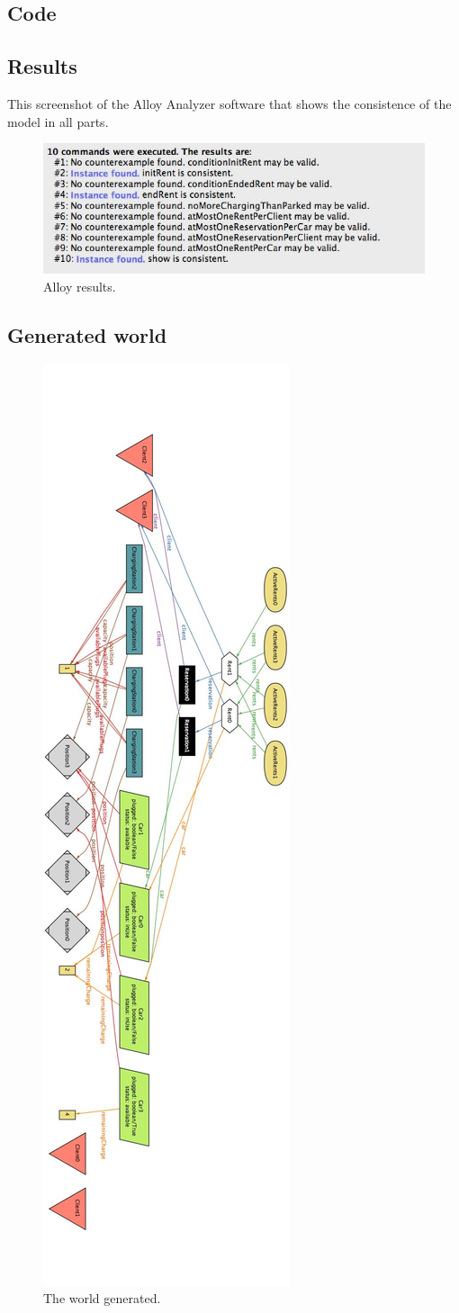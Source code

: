 \subsection{Code}


\subsection{Results}
This screenshot of the Alloy Analyzer software that shows the consistence of the model in all parts.

\begin{figure}[h]
\centering
\includegraphics[width=450 pt]{resources/alloyResults.jpg}
\caption{\label{fig:AlloyRes}Alloy results.}
\end{figure}

\newpage
\subsection{Generated world}

\begin{figure}[hp]
\centering
\includegraphics[height=526 pt]{resources/generatedWorld.jpg}
\caption{\label{fig:AlloyWorld}The world generated.}
\end{figure}